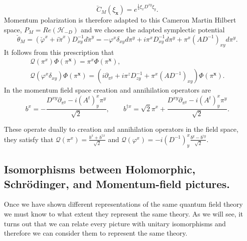 \documentclass[12pt]{article}%
\begin{document}
\begin{equation}
    \label{eq:measure_momentum_C}
    \breve{C}_M(\xi_\mathbf{x})= e^{\frac14\xi_xD^{xy}\xi_y}. 
    \end{equation}
Momentum polarization is therefore adapted to this Cameron Martin Hilbert space, $P_M=Re(\mathcal{H}_{-D})$ and we choose the adapted symplectic potential
\begin{equation}
\label{eq:symplectic}
\breve{\theta}_M=(\breve\varphi^x+i\breve\pi^x)D^{-1}_{xy}d\breve\pi^y=-\varphi^x\delta_{xy}d\pi^y+i\pi^xD^{-1}_{xy} d\pi^y+\pi^x(AD^{-1})_{xy}d\pi^y.
\end{equation} 
It follows from this prescription that 
\begin{multline}
    \label{eq:quantizationOfmomentumOperators}
    \mathcal{Q}(\pi^x) \Phi (\pi^\mathbf{x})= \pi^x \Phi(\pi^\mathbf{x}),\\
     \mathcal{Q}(\varphi^x\delta_{xy})\Phi (\pi^\mathbf{x})=\left (i\partial_{\pi^y}+i{\pi^zD^{-1}_{zy}}+{\pi^x(AD^{-1})_{xy}}\right ) \Phi(\pi^\mathbf{x}).
\end{multline}
In the momentum field space creation and annihilation operators are 
\begin{equation}
\label{eq:crationannihilationmomentum}
b^x= -\frac{D^{xy}\partial_{\pi^y}-i(A^t)^x_{y}\pi^y}{\sqrt{2}}, \qquad b^{\dagger x}=\sqrt{2}\pi^x+\frac{D^{xy}\partial_{\pi^y}-i(A^t)^x_{y}\pi^y}{\sqrt{2}}.
\end{equation}

These operate dually to creation and annihilation operators in the field space, they satisfy that  $\mathcal{Q}(\pi^x)= \frac{b^x+b^{\dagger x}}{\sqrt2}$ and $\mathcal{Q}(\varphi^x)= -i(D^{-1})^x_{y}\frac{b^y-b^{\dagger y}}{\sqrt2}$.

\subsection{Isomorphisms between Holomorphic, Schrödinger, and Momentum-field pictures.}
Once we have shown different representations of the same quantum field theory we must know to what extent they represent the same theory. As we will see, it turns out that we can relate every picture with unitary isomorphisms and therefore we can consider them to represent the same theory.   
\end{document}
